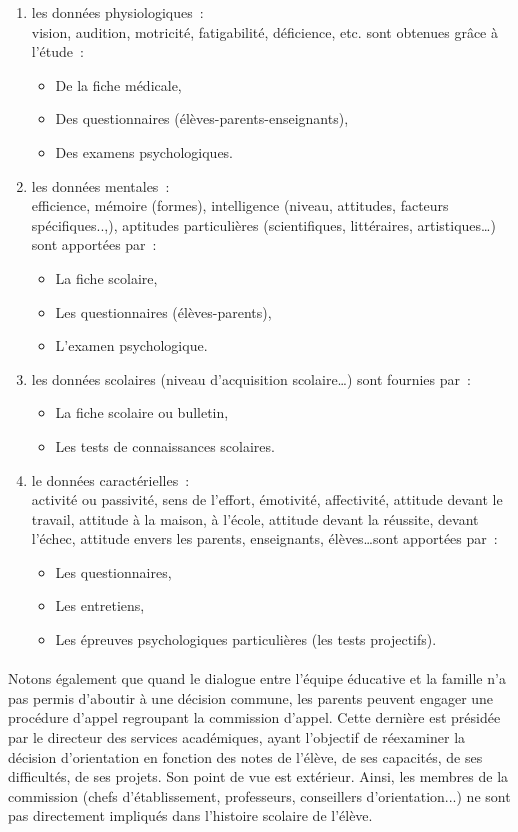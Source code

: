 \begin{itemize}[label=\textbullet]
\begin{enumerate}
	\item les données physiologiques : \\
	vision, audition, motricité, fatigabilité, déficience, etc. sont obtenues grâce à l’étude :\\
	\begin{itemize}
		\item De la fiche médicale,
		\item Des questionnaires (élèves-parents-enseignants),
		\item Des examens psychologiques.
	\end{itemize}
	\item les données mentales :\\
	 efficience, mémoire (formes), intelligence (niveau, attitudes, facteurs spécifiques..,), aptitudes particulières (scientifiques, littéraires, artistiques…) sont apportées par :
	 	\begin{itemize}
	 	\item La fiche scolaire,
        \item Les questionnaires (élèves-parents),
		\item L’examen psychologique.
		\end{itemize}
	\item les données scolaires (niveau d’acquisition scolaire…) sont fournies par :\\
			\begin{itemize}
			\item La fiche scolaire ou bulletin,
			\item Les tests de connaissances scolaires.
			\end{itemize}
	\item le données caractérielles :\\
	activité ou passivité, sens de l’effort, émotivité, affectivité, attitude devant le travail, attitude à la maison, à l’école, attitude devant la réussite, devant l’échec, attitude envers les parents, enseignants, élèves…sont apportées par :
	\begin{itemize}
	\item	Les questionnaires,
	\item	Les entretiens,
   	\item    Les épreuves psychologiques particulières (les tests projectifs).
	\end{itemize}
\end{enumerate}
\end{itemize}
\paragraph{}
Notons également que quand le dialogue entre l'équipe éducative et la famille n’a pas permis d'aboutir à une  décision commune, les parents peuvent engager une procédure d'appel regroupant la commission d’appel. Cette dernière est présidée par  le directeur des services académiques, ayant l’objectif de réexaminer la décision d'orientation  en fonction des notes de l'élève, de ses capacités, de ses difficultés, de ses projets. Son point  de vue est extérieur.  Ainsi, les membres de la commission (chefs d'établissement, professeurs,  conseillers d’orientation...) ne sont pas directement impliqués dans l’histoire scolaire de  l’élève.

